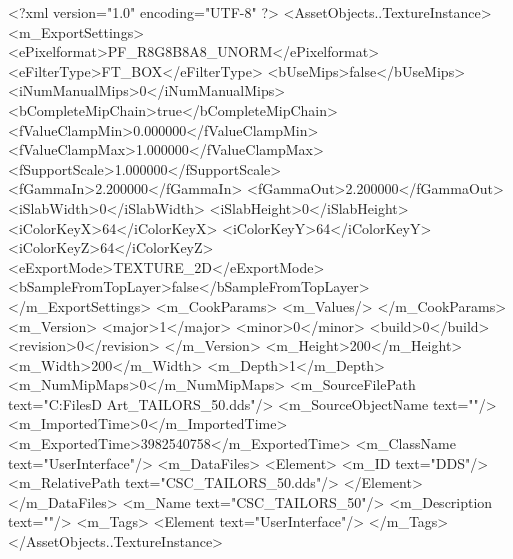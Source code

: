 <?xml version="1.0" encoding="UTF-8" ?>
<AssetObjects..TextureInstance>
	<m_ExportSettings>
		<ePixelformat>PF_R8G8B8A8_UNORM</ePixelformat>
		<eFilterType>FT_BOX</eFilterType>
		<bUseMips>false</bUseMips>
		<iNumManualMips>0</iNumManualMips>
		<bCompleteMipChain>true</bCompleteMipChain>
		<fValueClampMin>0.000000</fValueClampMin>
		<fValueClampMax>1.000000</fValueClampMax>
		<fSupportScale>1.000000</fSupportScale>
		<fGammaIn>2.200000</fGammaIn>
		<fGammaOut>2.200000</fGammaOut>
		<iSlabWidth>0</iSlabWidth>
		<iSlabHeight>0</iSlabHeight>
		<iColorKeyX>64</iColorKeyX>
		<iColorKeyY>64</iColorKeyY>
		<iColorKeyZ>64</iColorKeyZ>
		<eExportMode>TEXTURE_2D</eExportMode>
		<bSampleFromTopLayer>false</bSampleFromTopLayer>
	</m_ExportSettings>
	<m_CookParams>
		<m_Values/>
	</m_CookParams>
	<m_Version>
		<major>1</major>
		<minor>0</minor>
		<build>0</build>
		<revision>0</revision>
	</m_Version>
	<m_Height>200</m_Height>
	<m_Width>200</m_Width>
	<m_Depth>1</m_Depth>
	<m_NumMipMaps>0</m_NumMipMaps>
	<m_SourceFilePath text="C:\Users\Shadow\Desktop\Working Files\2D Art\Quarters\Tailors\CSC_TAILORS_50.dds"/>
	<m_SourceObjectName text=""/>
	<m_ImportedTime>0</m_ImportedTime>
	<m_ExportedTime>3982540758</m_ExportedTime>
	<m_ClassName text="UserInterface"/>
	<m_DataFiles>
		<Element>
			<m_ID text="DDS"/>
			<m_RelativePath text="CSC_TAILORS_50.dds"/>
		</Element>
	</m_DataFiles>
	<m_Name text="CSC_TAILORS_50"/>
	<m_Description text=""/>
	<m_Tags>
		<Element text="UserInterface"/>
	</m_Tags>
</AssetObjects..TextureInstance>

